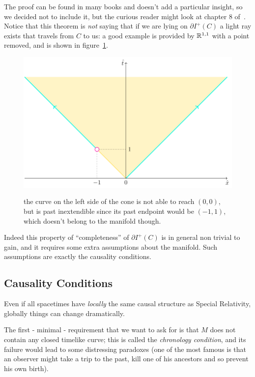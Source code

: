 The proof can be found in many books and doesn't add a particular insight, so we 
decided not to include it, but the curious reader might look at chapter \(8\) 
of~\cite{wald2010general}. 
Notice that this theorem is \emph{not} saying that if we are lying on \(\partial I^+(C)\) 
a light ray exists that travels from \(C\) to us: a good example is provided by
\({\mathbb{R}}^{1,1}\) with a point removed, and is shown in figure~\ref{fig:inextendible-but-incomplete}.
\begin{figure}
	\centering
	\caption{the curve on the left side of the cone is not able to reach \((0,0)\), but
	is past inextendible since its past endpoint would be \((-1, 1)\), which doesn't belong
	to the manifold though.}
	\includegraphics[scale=0.7]{Immagini/inextendible-but-incomplete/inextendible-but-incomplete.pdf}
	\label{fig:inextendible-but-incomplete}
\end{figure}
Indeed this property of ``completeness'' of \(\partial I^+(C)\) is in general non trivial to gain, and it requires some extra assumptions about the manifold. Such assumptions are exactly the causality conditions.

\subsection{Causality Conditions}
Even if all spacetimes have \emph{locally} the same causal structure as Special Relativity, globally things can change dramatically.

The first - minimal - requirement that we want to ask for is that \(M\) does not contain any  closed timelike curve; this is called the \emph{chronology condition}, and its failure would lead to some distressing paradoxes (one of the most famous is that an observer might take a trip to the past, kill one of his ancestors and so prevent his own birth).

